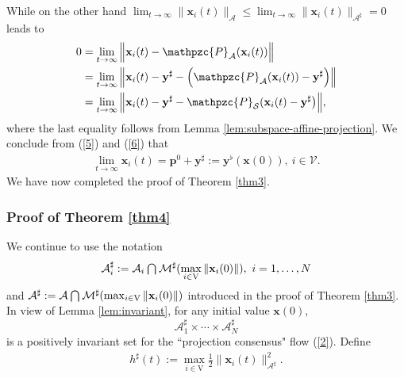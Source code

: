 \documentclass[a4paper, 11pt]{article}
\newcommand*\mcap{\mathbin{\mathpalette\mcapinn\relax}}
\newcommand*\mcapinn[2]{\vcenter{\hbox{$\mathsurround=0pt
  \ifx\displaystyle#1\textstyle\else#1\fi\bigcap$}}}
\begin{document}
While on the other hand $\lim_{t\rightarrow \infty}\|\mathbf{x}_i(t)\|_{\mathcal{A}}\leq \lim_{t\to \infty} \|\mathbf{x}_i(t)\|_{\mathcal{A}^\sharp}=0$ leads to
\begin{align}\label{6}
0&=\lim_{t\rightarrow \infty}
\Big\| \mathbf{x}_i(t)-\mathpzc{P}_{\mathcal{A}}(\mathbf{x}_i(t))\Big\|\nonumber\\
&=\lim_{t\rightarrow \infty}
\Big\| \mathbf{x}_i(t)-\mathbf{y}^\sharp-\Big(\mathpzc{P}_{\mathcal{A}}(\mathbf{x}_i(t))-\mathbf{y}^\sharp\Big)\Big\|\nonumber\\
&=\lim_{t\rightarrow \infty}
\Big\| \mathbf{x}_i(t)-\mathbf{y}^\sharp-\mathpzc{P}_{\mathcal{S}}(\mathbf{x}_i(t)-\mathbf{y}^\sharp\big)\Big\|,
\end{align}
where the last equality follows from Lemma \ref{lem:subspace-affine-projection}. We conclude from (\ref{5}) and (\ref{6}) that
\begin{align}\label{21}
\lim_{t\to\infty} \mathbf{x}_i(t)=\mathbf{p}^0+\mathbf{y}^\sharp:=\mathbf{y}^\flat(\mathbf{x}(0)),\ i\in\mathcal{V}.
\end{align}
We have now completed the proof of Theorem \ref{thm3}.
\subsubsection{Proof of Theorem \ref{thm4}}
We continue to use the notation   $$
\mathcal{A}_i^\sharp:=\mathcal{A}_i \mcap\mathcal{M}^\sharp(\max_{i\in\mathrm{V}}\|\mathbf{x}_i(0)\|),\ i=1,\dots,N
$$
and $\mathcal{A}^\sharp:=\mathcal{A} \mcap\mathcal{M}^\sharp(\max_{i\in\mathrm{V}}\|\mathbf{x}_i(0)\|)$ introduced in the proof of Theorem \ref{thm3}. In view of Lemma \ref{lem:invariant}, for any initial value $\mathbf{x}(0)$,
 $$
\mathcal{A}_1^\sharp\times \cdots \times \mathcal{A}_N^\sharp
$$ is a positively invariant set for the ``projection consensus" flow (\ref{2}). Define
\begin{align}
h^\sharp(t):= \max_{i\in\mathrm{V}}\frac{1}{2}\big\|\mathbf{x}_i(t)\big\|_{\mathcal{A}^\sharp}^2.
\end{align}
\end{document}
